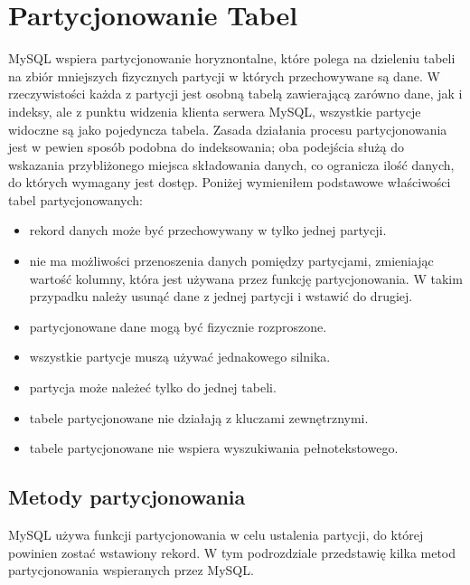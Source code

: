 \section{Partycjonowanie Tabel}
MySQL wspiera partycjonowanie horyznontalne, które polega na dzieleniu tabeli na zbiór mniejszych fizycznych partycji w których przechowywane są dane. W rzeczywistości każda z partycji jest osobną tabelą zawierającą zarówno dane, jak i indeksy, ale z punktu widzenia klienta serwera MySQL, wszystkie partycje widoczne są jako pojedyncza tabela. Zasada działania procesu partycjonowania jest w pewien sposób podobna do indeksowania; oba podejścia służą do wskazania przybliżonego miejsca składowania danych, co ogranicza ilość danych, do których wymagany jest dostęp.
Poniżej wymieniłem podstawowe właściwości tabel partycjonowanych:
\begin{itemize}
	\item rekord danych może być przechowywany w tylko jednej partycji.
	\item nie ma możliwości przenoszenia danych pomiędzy partycjami, zmieniając wartość kolumny, która jest używana przez funkcję partycjonowania. W takim przypadku należy usunąć dane z jednej partycji i wstawić do drugiej.
	\item partycjonowane dane mogą być fizycznie rozproszone.
	\item wszystkie partycje muszą używać jednakowego silnika.
	\item partycja może należeć tylko do jednej tabeli.
	\item tabele partycjonowane nie działają z kluczami zewnętrznymi.
	\item tabele partycjonowane nie wspiera wyszukiwania pełnotekstowego.
\end{itemize} 

\subsection{Metody partycjonowania}
MySQL używa funkcji partycjonowania w celu ustalenia partycji, do której powinien zostać wstawiony rekord. W tym podrozdziale przedstawię kilka metod partycjonowania wspieranych przez MySQL.


